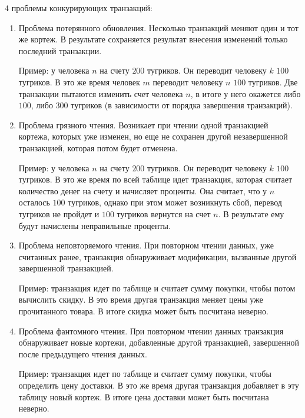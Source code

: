 4 проблемы конкурирующих транзакций:

\begin{enumerate}
\item
  Проблема потерянного обновления. Несколько транзакций меняют один и тот же
  кортеж. В результате сохраняется результат внесения изменений только последний
  транзакции.

  Пример: у человека \(n\) на счету \(200\) тугриков. Он переводит человеку
  \(k\) \(100\) тугриков. В это же время человек \(m\) переводит человеку \(n\)
  \(100\) тугриков. Две транзакции пытаются изменить счет человека \(n\), в
  итоге у него окажется либо \(100\), либо \(300\) тугриков (в зависимости от
  порядка завершения транзакций).

\item
  Проблема грязного чтения. Возникает при чтении одной транзакцией кортежа,
  которых уже изменен, но еще не сохранен другой незавершенной транзакцией,
  которая потом будет отменена.

  Пример: у человека \(n\) на счету \(200\) тугриков. Он переводит человеку
  \(k\) \(100\) тугриков. В это же время по всей таблице идет транзакция,
  которая считает количество денег на счету и начисляет проценты. Она считает,
  что у \(n\) осталось \(100\) тугриков, однако при этом может возникнуть сбой,
  перевод тугриков не пройдет и \(100\) тугриков вернутся на счет \(n\). В
  результате ему будут начислены неправильные проценты.

\item
  Проблема неповторяемого чтения. При повторном чтении данных, уже считанных
  ранее, транзакция обнаруживает модификации, вызванные другой завершенной
  транзакцией.

  Пример: транзакция идет по таблице и считает сумму покупки, чтобы потом
  вычислить скидку. В это время другая транзакция меняет цены уже прочитанного
  товара. В итоге скидка может быть посчитана неверно.

\item
  Проблема фантомного чтения. При повторном чтении данных транзакция
  обнаруживает новые кортежи, добавленные другой транзакцией, завершенной после
  предыдущего чтения данных.

  Пример: транзакция идет по таблице и считает сумму покупки, чтобы определить
  цену доставки. В это же время другая транзакция добавляет в эту таблицу новый
  кортеж. В итоге цена доставки может быть посчитана неверно.
\end{enumerate}

